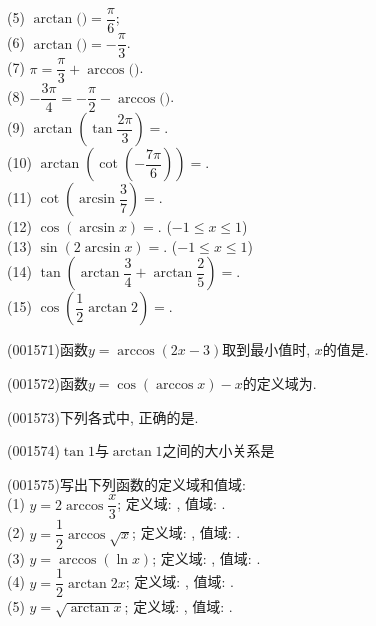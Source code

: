 (5) $\arctan($$)=\dfrac{\pi}{6}$;\\ 
(6) $\arctan($$)=-\dfrac{\pi}{3}$.\\ 
(7) $\pi=\dfrac{\pi}{3}+\arccos($$)$.\\ 
(8) $-\dfrac{3\pi}{4}=-\dfrac{\pi}{2}-\arccos($$)$.\\ 
(9) $\arctan \left(\tan \dfrac{2\pi}{3}\right)=$.\\ 
(10) $\arctan\left(\cot\left(-\dfrac{7\pi}{6}\right)\right)=$.\\ 
(11) $\cot \left(\arcsin \dfrac{3}{7}\right)=$.\\ 
(12) $\cos (\arcsin x)=$. ($-1\le x\le 1$)\\ 
(13) $\sin (2\arcsin x)=$. ($-1\le x\le 1$)\\ 
(14) $\tan \left(\arctan \dfrac{3}{4}+\arctan \dfrac{2}{5}\right)=$.\\ 
(15) $\cos \left(\dfrac{1}{2}\arctan 2\right)=$.
\item (001571)函数$y=\arccos(2x-3)$取到最小值时, $x$的值是.
\item (001572)函数$y=\cos(\arccos x)-x$的定义域为.
\item (001573)下列各式中, 正确的是.
\item (001574)$\tan 1$与$\arctan 1$之间的大小关系是
\item (001575)写出下列函数的定义域和值域:\\ 
(1) $y=2\arccos \dfrac{x}{3}$; 定义域: , 值域: .\\ 
(2) $y=\dfrac{1}{2}\arccos \sqrt{x}$; 定义域: , 值域: .\\ 
(3) $y=\arccos(\ln x)$; 定义域: , 值域: .\\ 
(4) $y=\dfrac{1}{2}\arctan 2x$; 定义域: , 值域: .\\ 
(5) $y=\sqrt{\arctan x}$; 定义域: , 值域: .\\ 
